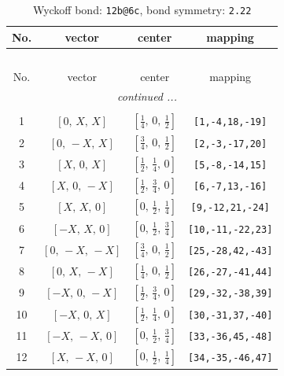 \documentclass[fleqn,8pt]{jsarticle}
\begin{document}
\renewcommand{\arraystretch}{1.2}
\begin{longtable}{cccc}
\caption{Wyckoff bond: {\tt 12b@6c}, bond symmetry: {\tt 2.22}}
 \\
 \hline \hline
No. & vector & center & mapping \\ \hline \endfirsthead

\multicolumn{3}{l}{\tablename\ \thetable{}} \\
 \hline \hline
No. & vector & center & mapping \\ \hline \endhead

 \hline \hline
\multicolumn{3}{r}{\footnotesize\it continued ...} \\ \endfoot

 \hline \hline
\multicolumn{3}{r}{} \\ \endlastfoot

1 & $\left[ 0,\, X,\, X \right]$ & $\left[ \frac{1}{4},\, 0,\, \frac{1}{2} \right]$ & {\tt [1,-4,18,-19]} \\ \hline
2 & $\left[ 0,\, - X,\, X \right]$ & $\left[ \frac{3}{4},\, 0,\, \frac{1}{2} \right]$ & {\tt [2,-3,-17,20]} \\ \hline
3 & $\left[ X,\, 0,\, X \right]$ & $\left[ \frac{1}{2},\, \frac{1}{4},\, 0 \right]$ & {\tt [5,-8,-14,15]} \\ \hline
4 & $\left[ X,\, 0,\, - X \right]$ & $\left[ \frac{1}{2},\, \frac{3}{4},\, 0 \right]$ & {\tt [6,-7,13,-16]} \\ \hline
5 & $\left[ X,\, X,\, 0 \right]$ & $\left[ 0,\, \frac{1}{2},\, \frac{1}{4} \right]$ & {\tt [9,-12,21,-24]} \\ \hline
6 & $\left[ - X,\, X,\, 0 \right]$ & $\left[ 0,\, \frac{1}{2},\, \frac{3}{4} \right]$ & {\tt [10,-11,-22,23]} \\ \hline
7 & $\left[ 0,\, - X,\, - X \right]$ & $\left[ \frac{3}{4},\, 0,\, \frac{1}{2} \right]$ & {\tt [25,-28,42,-43]} \\ \hline
8 & $\left[ 0,\, X,\, - X \right]$ & $\left[ \frac{1}{4},\, 0,\, \frac{1}{2} \right]$ & {\tt [26,-27,-41,44]} \\ \hline
9 & $\left[ - X,\, 0,\, - X \right]$ & $\left[ \frac{1}{2},\, \frac{3}{4},\, 0 \right]$ & {\tt [29,-32,-38,39]} \\ \hline
10 & $\left[ - X,\, 0,\, X \right]$ & $\left[ \frac{1}{2},\, \frac{1}{4},\, 0 \right]$ & {\tt [30,-31,37,-40]} \\ \hline
11 & $\left[ - X,\, - X,\, 0 \right]$ & $\left[ 0,\, \frac{1}{2},\, \frac{3}{4} \right]$ & {\tt [33,-36,45,-48]} \\ \hline
12 & $\left[ X,\, - X,\, 0 \right]$ & $\left[ 0,\, \frac{1}{2},\, \frac{1}{4} \right]$ & {\tt [34,-35,-46,47]} \\
\end{longtable}
\end{document}
